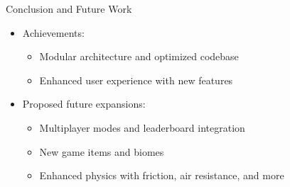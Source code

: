 
\begin{frame}{Conclusion and Future Work}
    \begin{itemize}
        \item Achievements:
        \begin{itemize}
            \item Modular architecture and optimized codebase
            \item Enhanced user experience with new features
        \end{itemize}
        \item Proposed future expansions:
        \begin{itemize}
            \item Multiplayer modes and leaderboard integration
            \item New game items and biomes
            \item Enhanced physics with friction, air resistance, and more
        \end{itemize}
    \end{itemize}
\end{frame}